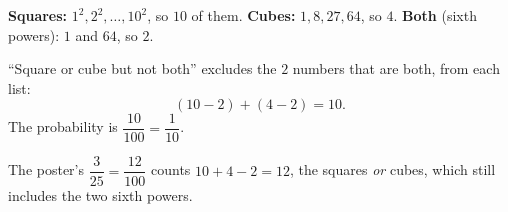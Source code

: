 \textbf{Squares:} $1^2,2^2,\dots,10^2$, so $10$ of them. \textbf{Cubes:} $1,8,27,64$, so $4$. \textbf{Both} (sixth powers): $1$ and $64$, so $2$.

``Square or cube but not both'' excludes the $2$ numbers that are both, from each list:
\[
(10-2)+(4-2)=10 .
\]
The probability is $\dfrac{10}{100}=\boxed{\dfrac{1}{10}}$.

The poster's $\dfrac{3}{25}=\dfrac{12}{100}$ counts $10+4-2=12$, the squares \emph{or} cubes, which still includes the two sixth powers.

